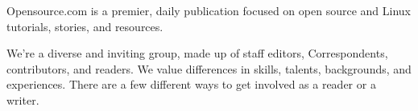 \documentclass{article}
\begin{document}
Opensource.com is a premier, daily publication focused on
open source and Linux tutorials, stories, and resources.

We're a diverse and inviting group, made up of staff
editors, Correspondents, contributors, and readers. We
value differences in skills, talents, backgrounds, and
experiences. There are a few different ways to get involved
as a reader or a writer.
\end{document}
